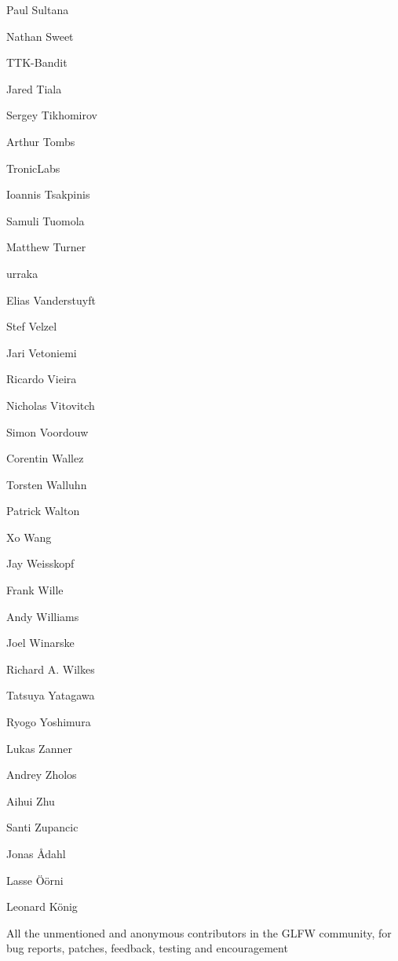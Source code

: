 \begin{DoxyItemize}
\item Paul Sultana
\item Nathan Sweet
\item TTK-\/\+Bandit
\item Jared Tiala
\item Sergey Tikhomirov
\item Arthur Tombs
\item Tronic\+Labs
\item Ioannis Tsakpinis
\item Samuli Tuomola
\item Matthew Turner
\item urraka
\item Elias Vanderstuyft
\item Stef Velzel
\item Jari Vetoniemi
\item Ricardo Vieira
\item Nicholas Vitovitch
\item Simon Voordouw
\item Corentin Wallez
\item Torsten Walluhn
\item Patrick Walton
\item Xo Wang
\item Jay Weisskopf
\item Frank Wille
\item Andy Williams
\item Joel Winarske
\item Richard A. Wilkes
\item Tatsuya Yatagawa
\item Ryogo Yoshimura
\item Lukas Zanner
\item Andrey Zholos
\item Aihui Zhu
\item Santi Zupancic
\item Jonas Ådahl
\item Lasse Öörni
\item Leonard König
\item All the unmentioned and anonymous contributors in the GLFW community, for bug reports, patches, feedback, testing and encouragement 
\end{DoxyItemize}